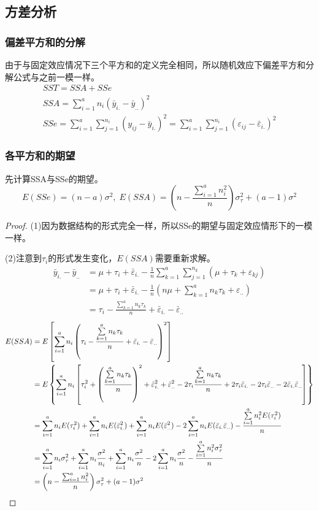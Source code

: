 \subsection{方差分析}
\subsubsection{偏差平方和的分解}
由于与固定效应情况下三个平方和的定义完全相同，所以随机效应下偏差平方和分解公式与之前一模一样。
\begin{gather*}
	SST=SSA+SSe \\
	SSA=\sum_{i=1}^an_i(\bar{y}_{i.}-\bar{y}_{..})^2 \\
	SSe=\sum_{i=1}^a\sum_{j=1}^{n_i}(y_{ij}-\bar{y}_{i.})^2=\sum_{i=1}^a\sum_{j=1}^{n_i}(\varepsilon_{ij}-\bar{\varepsilon}_{i.})^2
\end{gather*}
\subsubsection{各平方和的期望}
先计算SSA与SSe的期望。
\begin{equation*}
	E(SSe)=(n-a)\sigma^2,\;E(SSA)=\left(n-\frac{\sum\limits_{i=1}^an_i^2}{n}\right)\sigma_\tau^2+(a-1)\sigma^2
\end{equation*}
\begin{proof}
	(1)因为数据结构的形式完全一样，所以SSe的期望与固定效应情形下的一模一样。\par
	(2)注意到$\tau_i$的形式发生变化，$E(SSA)$需要重新求解。
	\begin{align*}
		\bar{y}_{i.}-\bar{y}_{..}
		&=\mu+\tau_i+\bar{\varepsilon}_{i.}-\frac{1}{n}\sum_{k=1}^a\sum_{j=1}^{n_k}(\mu+\tau_k+\varepsilon_{kj}) \\
		&=\mu+\tau_i+\bar{\varepsilon}_{i.}-\frac{1}{n}\left(n\mu+\sum_{k=1}^an_k\tau_k+\varepsilon_{..}\right) \\
		&=\tau_i-\frac{\sum\limits_{k=1}^an_k\tau_k}{n}+\bar{\varepsilon}_{i.}-\bar{\varepsilon}_{..}
	\end{align*}
	\begin{align*}
		E(SSA)
		&=E\left[\sum_{i=1}^an_i\left(\tau_i-\frac{\sum\limits_{k=1}^an_k\tau_k}{n}+\bar{\varepsilon}_{i.}-\bar{\varepsilon}_{..}\right)^2\right] \\
		&=E\left\{\sum_{i=1}^an_i\left[\tau_i^2+\left(\frac{\sum\limits_{k=1}^an_k\tau_k}{n}\right)^2+\bar{\varepsilon}_{i.}^2+\bar{\varepsilon}_{..}^2-2\tau_i\frac{\sum\limits_{k=1}^an_k\tau_k}{n}+2\tau_i\bar{\varepsilon}_{i.}-2\tau_i\bar{\varepsilon}_{..}-2\bar{\varepsilon}_{i.}\bar{\varepsilon}_{..}\right]\right\} \\
		&=\sum_{i=1}^an_iE(\tau_i^2)+\sum_{i=1}^an_iE(\bar{\varepsilon}_{i.}^2)+\sum_{i=1}^an_iE(\bar{\varepsilon}_{..}^2)-2\sum_{i=1}^an_iE(\bar{\varepsilon}_{i.}\bar{\varepsilon}_{..})-\frac{\sum\limits_{i=1}^an_i^2E(\tau_i^2)}{n} \\
		&=\sum_{i=1}^an_i\sigma_\tau^2+\sum_{i=1}^an_i\frac{\sigma^2}{n_i}+\sum_{i=1}^an_i\frac{\sigma^2}{n}-2\sum_{i=1}^an_i\frac{\sigma^2}{n}-\frac{\sum\limits_{i=1}^an_i^2\sigma_\tau^2}{n} \\
		&=\left(n-\frac{\sum_{i=1}^an_i^2}{n}\right)\sigma_\tau^2+(a-1)\sigma^2\qedhere
	\end{align*}
\end{proof}
